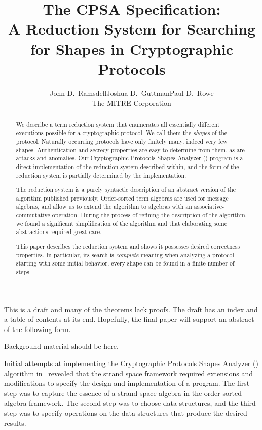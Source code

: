 \documentclass[12pt]{article}
\title{The CPSA Specification:\\
A Reduction System for Searching for Shapes in Cryptographic Protocols}
\author{John D.~Ramsdell\quad Joshua D.~Guttman\quad Paul D.~Rowe\\
The MITRE Corporation}
\theoremstyle{definition}
\newenvironment{note}{\itshape\par\noindent}{}
\begin{document}
\maketitle
\cpsacopying

\begin{note}
This is a draft and many of the theorems lack proofs.  The draft has
an index and a table of contents at its end.  Hopefully, the final
paper will support an abstract of the following form.
\end{note}

\begin{abstract}
We describe a term reduction system that enumerates all essentially
different executions possible for a cryptographic protocol.  We call
them the \emph{shapes} of the protocol.  Naturally occurring protocols
have only finitely many, indeed very few shapes.  Authentication and
secrecy properties are easy to determine from them, as are attacks and
anomalies.  Our Cryptographic Protocols Shapes Analyzer ({\cpsa})
program is a direct implementation of the reduction system described
within, and the form of the reduction system is partially determined
by the implementation.

The reduction system is a purely syntactic description of an abstract
version of the algorithm published previously.  Order-sorted term
algebras are used for message algebras, and allow us to extend the
algorithm to algebras with an associative-commutative operation.
During the process of refining the description of the algorithm, we
found a significant simplification of the algorithm and that
elaborating some abstractions required great care.

This paper describes the reduction system and shows it possesses
desired correctness properties.  In particular, its search is
\emph{complete} meaning when analyzing a protocol starting with
some initial behavior, every shape can be found in a finite number of
steps.
\end{abstract}

\begin{note}
Background material should be here.
\end{note}

Initial attempts at implementing the Cryptographic Protocols Shapes
Analyzer ({\cpsa}) algorithm in~\cite{DoghmiGuttmanThayer07} revealed
that the strand space framework required extensions and modifications
to specify the design and implementation of a {\cpsa} program.  The
first step was to capture the essence of a strand space algebra in the
order-sorted algebra framework.  The second step was to choose data
structures, and the third step was to specify operations on the data
structures that produce the desired results.
\end{document}
